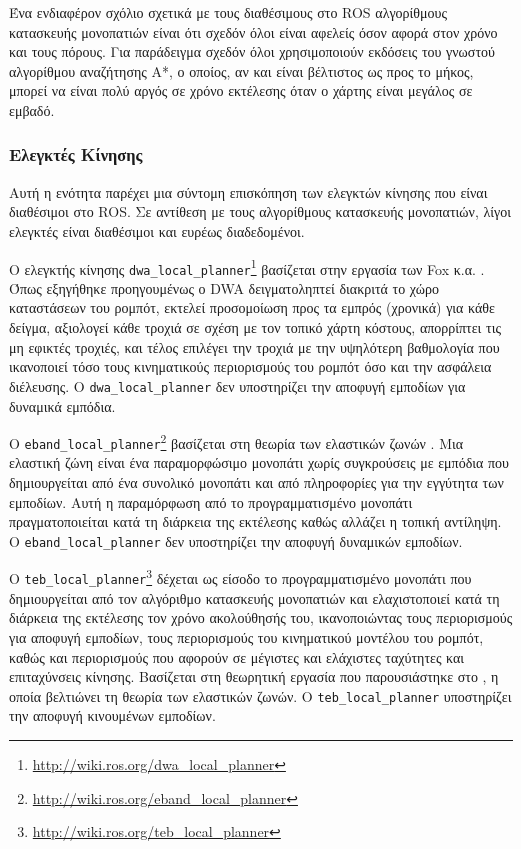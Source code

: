 Ένα ενδιαφέρον σχόλιο σχετικά με τους διαθέσιμους στο ROS αλγορίθμους
κατασκευής μονοπατιών είναι ότι σχεδόν όλοι είναι αφελείς όσον αφορά στον χρόνο
και τους πόρους. Για παράδειγμα σχεδόν όλοι χρησιμοποιούν εκδόσεις του γνωστού
αλγορίθμου αναζήτησης A*, ο οποίος, αν και είναι βέλτιστος ως προς το μήκος,
μπορεί να είναι πολύ αργός σε χρόνο εκτέλεσης όταν ο χάρτης είναι μεγάλος σε
εμβαδό.

\subsubsection{Ελεγκτές Κίνησης}
\label{subsubsection:02_01_02:03_02}

Αυτή η ενότητα παρέχει μια σύντομη επισκόπηση των ελεγκτών κίνησης που είναι
διαθέσιμοι στο ROS. Σε αντίθεση με τους αλγορίθμους κατασκευής μονοπατιών, λίγοι
ελεγκτές είναι διαθέσιμοι και ευρέως διαδεδομένοι.

Ο ελεγκτής κίνησης
\texttt{dwa\_local\_planner}\footnote{\url{http://wiki.ros.org/dwa\_local\_planner}}
βασίζεται στην εργασία των Fox κ.α. \cite{Fox1997}. Όπως εξηγήθηκε
προηγουμένως ο DWA δειγματοληπτεί διακριτά το χώρο καταστάσεων του ρομπότ,
εκτελεί προσομοίωση προς τα εμπρός (χρονικά) για κάθε δείγμα, αξιολογεί κάθε
τροχιά σε σχέση με τον τοπικό χάρτη κόστους, απορρίπτει τις μη εφικτές τροχιές,
και τέλος επιλέγει την τροχιά με την υψηλότερη βαθμολογία που ικανοποιεί τόσο
τους κινηματικούς περιορισμούς του ρομπότ όσο και την ασφάλεια διέλευσης. Ο
\texttt{dwa\_local\_planner} δεν υποστηρίζει την αποφυγή εμποδίων για δυναμικά
εμπόδια.

Ο
\texttt{eband\_local\_planner}\footnote{\url{http://wiki.ros.org/eband\_local\_planner}}
βασίζεται στη θεωρία των ελαστικών ζωνών \cite{Quinlan}. Μια ελαστική ζώνη
είναι ένα παραμορφώσιμο μονοπάτι χωρίς συγκρούσεις με εμπόδια που δημιουργείται
από ένα συνολικό μονοπάτι και από πληροφορίες για την εγγύτητα των εμποδίων.
Αυτή η παραμόρφωση από το προγραμματισμένο μονοπάτι πραγματοποιείται κατά τη
διάρκεια της εκτέλεσης καθώς αλλάζει η τοπική αντίληψη.  Ο
\texttt{eband\_local\_planner} δεν υποστηρίζει την αποφυγή δυναμικών εμποδίων.

Ο
\texttt{teb\_local\_planner}\footnote{\url{http://wiki.ros.org/teb\_local\_planner}}
δέχεται ως είσοδο το προγραμματισμένο μονοπάτι που δημιουργείται από τον
αλγόριθμο κατασκευής μονοπατιών και ελαχιστοποιεί κατά τη διάρκεια της
εκτέλεσης τον χρόνο ακολούθησής του, ικανοποιώντας τους περιορισμούς για
αποφυγή εμποδίων, τους περιορισμούς του κινηματικού μοντέλου του ρομπότ, καθώς
και περιορισμούς που αφορούν σε μέγιστες και ελάχιστες ταχύτητες και
επιταχύνσεις κίνησης.  Βασίζεται στη θεωρητική εργασία που παρουσιάστηκε στο
\cite{Rosmann2017}, η οποία βελτιώνει τη θεωρία των ελαστικών ζωνών. Ο
\texttt{teb\_local\_planner} υποστηρίζει την αποφυγή κινουμένων εμποδίων.

